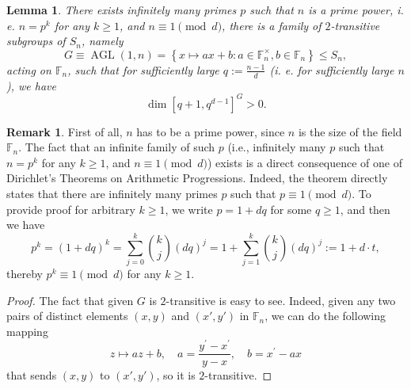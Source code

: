 \documentclass[10pt,twocolumn,superscriptaddress,aps,amsmath,amssymb,citeautoscript,floatfix,prx]{revtex4-2}
\theoremstyle{plain}
\theoremstyle{plain}
\theoremstyle{plain}
\theoremstyle{plain}
\theoremstyle{plain}
\theoremstyle{plain}
\theoremstyle{plain}
\newtheorem{smlemma}[smtheorem]{Lemma}
\theoremstyle{definition}
\newtheorem{smremark}[smtheorem]{Remark}
\theoremstyle{plain}
\begin{document}
\begin{appendix}
\begin{smlemma} \label{lem:2_transitive_subgroup}
    There exists infinitely many primes $p$ such that $n$ is a prime power, i. e. $n=p^k$ for any $k\geq 1$, and $n\equiv 1 \pmod{d}$, there is a family of $2$-transitive subgroups of $S_n$, namely
    \begin{equation}\label{eq:AGL}
        G\equiv\operatorname{AGL}(1, n)=\left\{x \mapsto a x+b: a \in \mathbb{F}_n^{\times}, b \in \mathbb{F}_n\right\}\leq S_n,
    \end{equation}
    acting on $\mathbb{F}_n$, such that for sufficiently large $q:=\frac{n-1}{d}$ (i. e. for sufficiently large $n$), we have 
    \[\dim [q+1, q^{d-1}]^G > 0.\]
\end{smlemma}

\begin{smremark} \label{rem:infinitely_many_primes}
    First of all, $n$ has to be a prime power, since $n$ is the size of the field $\mathbb{F}_{n}$. 
    The fact that an infinite family of such $p$ (i.e., infinitely many $p$ such that $n=p^k$ for any $k\geq 1$, and $n\equiv 1 \pmod{d}$) exists is a direct consequence of one of Dirichlet's 
    Theorems on Arithmetic Progressions.
    Indeed, the theorem directly states that there are infinitely many primes $p$ such that $p \equiv 1 \pmod{d}$.
    To provide proof for arbitrary $k\geq 1$, we write $p=1+d q$ for some $q\geq 1$, and then we have
    \[
        p^k=(1+d q)^k=\sum_{j=0}^k\binom{k}{j}(d q)^j=1+\sum_{j=1}^k\binom{k}{j}(d q)^j := 1+d \cdot t,
    \]
    thereby $p^k \equiv 1 \pmod{d}$ for any $k\geq 1$.
\end{smremark}

\begin{proof}
The fact that given $G$ is $2$-transitive is easy to see. Indeed, given any two pairs of distinct elements $(x, y)$ and $(x', y')$ in $\mathbb{F}_n$, we can do the following mapping
\[
    z \mapsto a z+b, \quad a=\frac{y^{\prime}-x^{\prime}}{y-x}, \quad b=x^{\prime}-a x
\]
that sends $(x, y)$ to $(x', y')$, so it is $2$-transitive.


\end{proof}
\end{appendix}
\end{document}

